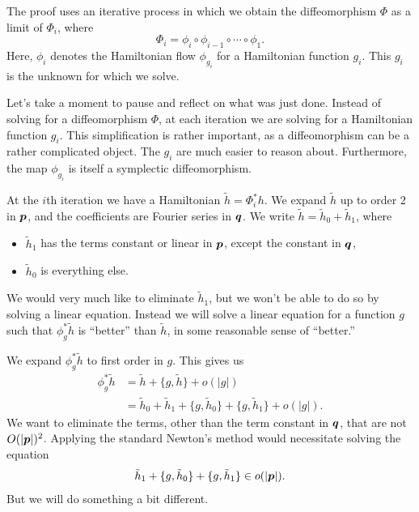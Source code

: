 \documentclass[twoside,letterpaper,11pt]{article}
\numberwithin{equation}{section}
\begin{document}
The proof uses an iterative process in which we obtain the diffeomorphism $\Phi$
as a limit of $\Phi_i$, where
\begin{equation*}
  \Phi_i = \phi_i \circ \phi_{i - 1} \circ \cdots \circ \phi_1.
\end{equation*}
Here, $\phi_i$ denotes the Hamiltonian flow $\phi_{g_i}$ for a Hamiltonian
function $g_i$.
This $g_i$ is the unknown for which we solve.

Let's take a moment to pause and reflect on what was just done.
Instead of solving for a diffeomorphism $\Phi$, at each iteration we are solving
for a Hamiltonian function $g_i$.
This simplification is rather important, as a diffeomorphism can be a rather
complicated object.
The $g_i$ are much easier to reason about.
Furthermore, the map $\phi_{g_i}$ is itself a symplectic diffeomorphism.

At the $i$th iteration we have a Hamiltonian $\tilde{h} = \Phi_i^* h$.
We expand $\tilde{h}$ up to order $2$ in $\bm{p}$, and the coefficients are
Fourier series in $\bm{q}$.
We write $\tilde{h} = \tilde{h}_0 + \tilde{h}_1$, where
\begin{itemize}
\item $\tilde{h}_1$ has the terms constant or linear in $\bm{p}$, except the
  constant in $\bm{q}$,
\item $\tilde{h}_0$ is everything else.
\end{itemize}
We would very much like to eliminate $\tilde{h}_1$, but we won't be able to do
so by solving a linear equation.
Instead we will solve a linear equation for a function $g$ such that
$\phi_g^*\tilde{h}$ is ``better'' than $\tilde{h}$, in some reasonable sense of
``better.''

We expand $\phi_g^* \tilde{h}$ to first order in $g$.
This gives us
\begin{align*}
  \phi_g^* \tilde{h} &= \tilde{h} + \{g, \tilde{h}\} + o(|g|)\\
                     &= \tilde{h}_0 + \tilde{h}_1 + \{g, \tilde{h}_0\} + \{g,
                       \tilde{h}_1\} + o(|g|).
\end{align*}
We want to eliminate the terms, other than the term constant in $\bm{q}$, that
are not $O(|\bm{p}|)^2$.
Applying the standard Newton's method would necessitate solving the equation
\begin{equation*}
  \tilde{h}_1 + \{g, \tilde{h}_0\} + \{g, \tilde{h}_1\} \in o(|\bm{p}|).
\end{equation*}
But we will do something a bit different.
\end{document}

